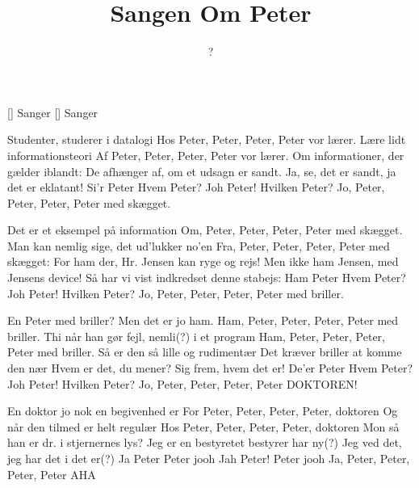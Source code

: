 \documentclass[a4paper,11pt]{article}
\title{Sangen Om Peter}
\author{?}
\begin{document}
\maketitle

\begin{roles}
  [] Sanger
  [] Sanger
\end{roles}

\begin{song}
   Studenter, studerer i datalogi
   Hos Peter, Peter, Peter, Peter vor lærer.
   Lære lidt informationsteori
   Af Peter, Peter, Peter, Peter vor lærer.
   Om informationer, der gælder iblandt:
  De afhænger af, om et udsagn er sandt.
   Ja, se, det er sandt, ja det er eklatant!
  Si'r Peter
   Hvem Peter?
   Joh Peter!
   Hvilken Peter?
   Jo, Peter, Peter, Peter, Peter med skægget.

   Det er et eksempel på information
   Om, Peter, Peter, Peter, Peter med skægget.
   Man kan nemlig sige, det ud'lukker no'en
   Fra, Peter, Peter, Peter, Peter med skægget:
   For ham der, Hr. Jensen kan ryge og rejs!
  Men ikke ham Jensen, med Jensens device!
   Så har vi vist indkredset denne stabejs:
  Ham Peter
   Hvem Peter?
   Joh Peter!
   Hvilken Peter?
   Jo, Peter, Peter, Peter, Peter med briller.

   En Peter med briller?  Men det er jo ham.
   Ham, Peter, Peter, Peter, Peter med briller.
   Thi når han gør fejl, nemli(?) i et program
   Ham, Peter, Peter, Peter, Peter med briller.
   Så er den så lille og rudimentær
  Det kræver briller at komme den nær
   Hvem er det, du mener?  Sig frem, hvem det er!
  De'er Peter
   Hvem Peter?
   Joh Peter!
   Hvilken Peter?
   Jo, Peter, Peter, Peter, Peter DOKTOREN!

   En doktor jo nok en begivenhed er
   For Peter, Peter, Peter, Peter, doktoren
   Og når den tilmed er helt regulær
   Hos Peter, Peter, Peter, Peter, doktoren
   Mon så han er dr. i stjernernes lys?
  Jeg er en bestyretet bestyrer har ny(?)
   Jeg ved det, jeg har det i det er(?)
  Ja Peter
   Peter jooh
   Jah Peter!
   Peter jooh
   Ja, Peter, Peter, Peter, Peter AHA
\end{song}
\end{document}
